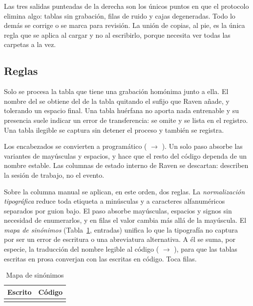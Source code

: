 Las tres salidas punteadas de la derecha son los únicos puntos en que el protocolo
elimina algo: tablas sin grabación, filas de ruido y cajas degeneradas. Todo lo
demás se corrige o se marca para revisión. La unión de copias, al pie, es la única
regla que se aplica al cargar  y no al escribirlo, porque necesita
ver todas las carpetas a la vez.

\subsection{Reglas}

 Solo se procesa la tabla que tiene una
grabación homónima junto a ella. El nombre del  se obtiene del de la
tabla quitando el sufijo  que Raven añade, y tolerando
un espacio final. Una tabla huérfana no aporta nada entrenable y su presencia
suele indicar un error de transferencia: se omite y se lista en el registro. Una
tabla ilegible se captura sin detener el proceso y también se registra.

 Los encabezados se convierten a
 programático ( $\to$
). Un solo paso absorbe las variantes de mayúsculas y
espacios, y hace que el resto del código dependa de un nombre estable. Las
columnas de estado interno de Raven se descartan: describen la sesión de trabajo,
no el evento.

 Sobre la columna manual se aplican,
en este orden, dos reglas. La \emph{normalización tipográfica} reduce toda
etiqueta a minúsculas y a caracteres alfanuméricos separados por guion bajo. El
paso absorbe mayúsculas, espacios y signos sin necesidad de enumerarlos, y en
\nTypography{} filas el valor cambia más allá de la mayúscula. El \emph{mapa de
    sinónimos} (Tabla~\ref{tab:sinonimos}, \nSynonymsMap{} entradas) unifica lo que
la tipografía no captura por ser un error de escritura o una abreviatura
alternativa. A él se suma, por especie, la traducción del nombre legible al
código ( $\to$ ), para que las tablas escritas en
prosa converjan con las escritas en código. Toca \nSynonyms{} filas.

\begin{table}[htbp]
    \centering
    \caption{Mapa de sinónimos}
    \label{tab:sinonimos}
    \small
    \begin{tabular}{@{}ll@{}}
        \toprule
        \textbf{Escrito} & \textbf{Código} \\
        \midrule
         \\
        \bottomrule
    \end{tabular}
\end{table}


